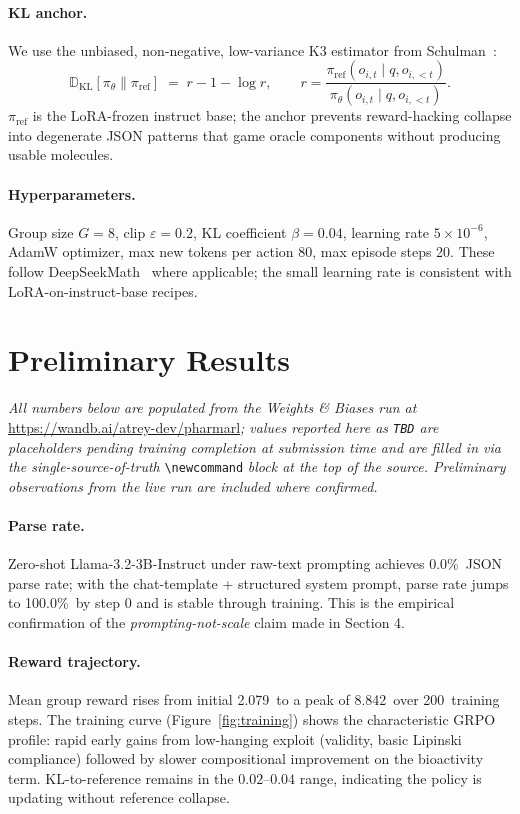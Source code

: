 \documentclass[11pt,a4paper]{article}
\newcommand{\parseRate}{100.0}               %
\newcommand{\meanReward}{2.079}              %
\newcommand{\maxReward}{8.842}               %
\newcommand{\trainSteps}{200}                %
\newcommand{\baselineParse}{0.0}             %
\newcommand{\groupSize}{8}                   %
\newcommand{\learningRate}{5{\times}10^{-6}}
\newcommand{\klCoef}{0.04}
\newcommand{\clipEps}{0.2}
\newcommand{\maxNewTokens}{80}
\newcommand{\maxEpisodeSteps}{20}
\newcommand{\wandbRunURL}{https://wandb.ai/atrey-dev/pharmarl}
\begin{document}
\paragraph{KL anchor.} We use the unbiased, non-negative, low-variance K3 estimator from Schulman~\cite{schulman2020klapprox}:
\begin{equation}
\mathbb{D}_{\text{KL}}[\pi_\theta\|\pi_{\text{ref}}] \;=\; r - 1 - \log r, \qquad r = \frac{\pi_{\text{ref}}(o_{i,t}\mid q,o_{i,<t})}{\pi_\theta(o_{i,t}\mid q,o_{i,<t})}.
\end{equation}
$\pi_{\text{ref}}$ is the LoRA-frozen instruct base; the anchor prevents reward-hacking collapse into degenerate JSON patterns that game oracle components without producing usable molecules.

\paragraph{Hyperparameters.} Group size $G=\groupSize$, clip $\varepsilon=\clipEps$, KL coefficient $\beta=\klCoef$, learning rate $\learningRate$, AdamW optimizer, max new tokens per action \maxNewTokens, max episode steps \maxEpisodeSteps. These follow DeepSeekMath~\cite{shao2024deepseekmath} where applicable; the small learning rate is consistent with LoRA-on-instruct-base recipes.

\section{Preliminary Results}

\textit{All numbers below are populated from the Weights \& Biases run at} \url{\wandbRunURL}\textit{; values reported here as \texttt{TBD} are placeholders pending training completion at submission time and are filled in via the single-source-of-truth} \verb|\newcommand| \textit{block at the top of the source. Preliminary observations from the live run are included where confirmed.}

\paragraph{Parse rate.} Zero-shot Llama-3.2-3B-Instruct under raw-text prompting achieves \baselineParse\%\ JSON parse rate; with the chat-template + structured system prompt, parse rate jumps to \parseRate\%\ by step 0 and is stable through training. This is the empirical confirmation of the \emph{prompting-not-scale} claim made in Section 4.

\paragraph{Reward trajectory.} Mean group reward rises from initial \meanReward\ to a peak of \maxReward\ over \trainSteps\ training steps. The training curve (Figure~\ref{fig:training}) shows the characteristic GRPO profile: rapid early gains from low-hanging exploit (validity, basic Lipinski compliance) followed by slower compositional improvement on the bioactivity term. KL-to-reference remains in the $0.02$--$0.04$ range, indicating the policy is updating without reference collapse.
\end{document}
